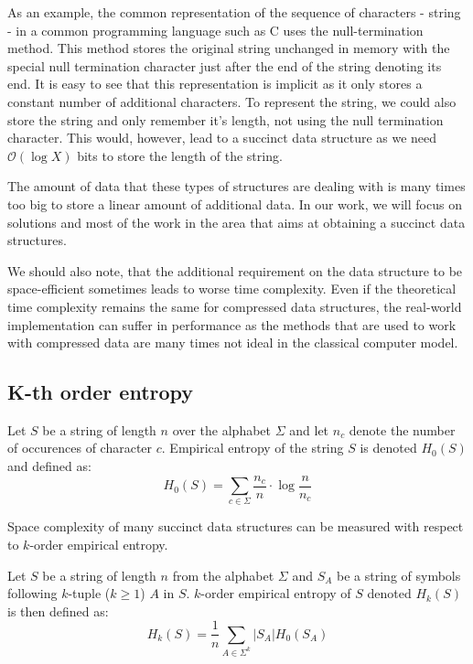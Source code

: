 As an example, the common representation of the sequence of characters - string - in a common programming language such as C uses the null-termination method. This method stores the original string unchanged in memory with the special null termination character just after the end of the string denoting its end. It is easy to see that this representation is implicit as it only stores a constant number of additional characters. To represent the string, we could also store the string and only remember it's length, not using the null termination character. This would, however, lead to a succinct data structure as we need $\mathcal{O}(\log X)$ bits to store the length of the string.

The amount of data that these types of structures are dealing with is many times too big to store a linear amount of additional data. In our work, we will focus on solutions and most of the work in the area that aims at obtaining a succinct data structures.

We should also note, that the additional requirement on the data structure to be space-efficient sometimes leads to worse time complexity. Even if the theoretical time complexity remains the same for compressed data structures, the real-world implementation can suffer in performance as the methods that are used to work with compressed data are many times not ideal in the classical computer model.

\subsection{K-th order entropy}

\begin{definition}
Let $S$ be a string of length $n$ over the alphabet $\Sigma$ and let $n_c$ denote the number of occurences of character
$c$. Empirical entropy of the string $S$ is denoted $H_0(S)$ and defined as:
$$H_0(S) = \sum_{c \in \Sigma} \frac{n_c}{n}\cdot \log\frac{n}{n_c}$$
\end{definition}

Space complexity of many succinct data structures can be measured with respect to $k$-order empirical entropy.

\begin{definition}
Let $S$ be a string of length $n$ from the alphabet $\Sigma$ and $S_A$ be a string of symbols following $k$-tuple ($k \geq 1$) $A$ in $S$. $k$-order empirical entropy of $S$ denoted $H_k(S)$ is then defined as:
$$H_k(S) = \frac{1}{n} \sum_{A \in \Sigma^k} |S_A| H_0(S_A)$$
\end{definition}

